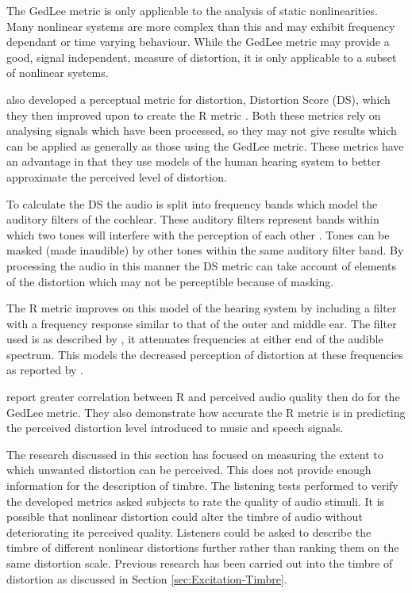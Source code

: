 		The GedLee metric is only applicable to the analysis of static nonlinearities. Many nonlinear systems are
		more complex than this and may exhibit frequency dependant or time varying behaviour.  While the GedLee
		metric may provide a good, signal independent, measure of distortion, it is only applicable to a subset of
		nonlinear systems.

		\citet{tan2003the} also developed a perceptual metric for distortion, Distortion Score (DS), which they then
		improved upon to create the R metric \citep{tan2004predicting}. Both these metrics rely on
		analysing signals which have been processed, so they may not give results which can be applied as generally
		as those using the GedLee metric. These metrics have an advantage in that they use models of the human
		hearing system to better approximate the perceived level of distortion.

		To calculate the DS the audio is split into frequency bands which model the auditory filters of the
		cochlear. These auditory filters represent bands within which two tones will interfere with the perception
		of each other \citep{fastl2007psychoacoustics}. Tones can be masked (made inaudible) by other tones within
		the same auditory filter band. By processing the audio in this manner the DS metric can take account of
		elements of the distortion which may not be perceptible because of masking.
		
		The R metric improves on this model of the hearing system by including a filter with a
		frequency response similar to that of the outer and middle ear. The filter used is as described by
		\citet{glasberg2002a}, it attenuates frequencies at either end of the audible spectrum. This models the
		decreased perception of distortion at these frequencies as reported by \citet{voishvillo2006assessment}.

		\citet{tan2004predicting} report greater correlation between R and perceived audio quality then
		\citet{lee2003auditory} do for the GedLee metric. They also demonstrate how accurate the R
		metric is in predicting the perceived distortion level introduced to music and speech signals.

		The research discussed in this section has focused on measuring the extent to which unwanted distortion can
		be perceived. This does not provide enough information for the description of timbre. The listening tests
		performed to verify the developed metrics asked subjects to rate the quality of audio stimuli. It is
		possible that nonlinear distortion could alter the timbre of audio without deteriorating its perceived
		quality. Listeners could be asked to describe the timbre of different nonlinear distortions further rather
		than ranking them on the same distortion scale. Previous research has been carried out into the timbre of
		distortion as discussed in Section \ref{sec:Excitation-Timbre}.

